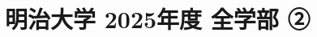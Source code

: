 \documentclass[../../uem_mat_mei_q.tex]{subfiles}
\begin{document}
    \section{明治大学 2025年度 全学部 ②}
    \subsection{　}
    
    \newpage
    \subsection{　}
    
    \newpage
    \subsection{　}
    
\end{document}
